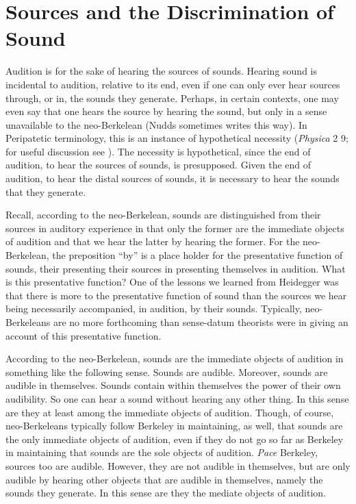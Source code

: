 
\section{Sources and the Discrimination of Sound} %
\label{sec:sources_and_the_discrimination_of_sound}

Audition is for the sake of hearing the sources of sounds. Hearing sound is incidental to audition, relative to its end, even if one can only ever hear sources through, or in, the sounds they generate. Perhaps, in certain contexts, one may even say that one hears the source by hearing the sound, but only in a sense unavailable to the neo-Berkelean (Nudds sometimes writes this way). In Peripatetic terminology, this is an instance of hypothetical necessity (\emph{Physica} 2 9; for useful discussion see \citealt{Charles:1988as}). The necessity is hypothetical, since the end of audition, to hear the sources of sounds, is presupposed. Given the end of audition, to hear the distal sources of sounds, it is necessary to hear the sounds that they generate.

Recall, according to the neo-Berkelean, sounds are distinguished from their sources in auditory experience in that only the former are the immediate objects of audition and that we hear the latter by hearing the former. For the neo-Berkelean, the preposition ``by'' is a place holder for the presentative function of sounds, their presenting their sources in presenting themselves in audition. What is this presentative function? One of the lessons we learned from Heidegger was that there is more to the presentative function of sound than the sources we hear being necessarily accompanied, in audition, by their sounds. Typically, neo-Berkeleans are no more forthcoming than sense-datum theorists were in giving an account of this presentative function.

According to the neo-Berkelean, sounds are the immediate objects of audition in something like the following sense. Sounds are audible. Moreover, sounds are audible in themselves. Sounds contain within themselves the power of their own audibility. So one can hear a sound without hearing any other thing.  In this sense are they at least among the immediate objects of audition. Though, of course, neo-Berkeleans typically follow Berkeley in maintaining, as well, that sounds are the only immediate objects of audition, even if they do not go so far as Berkeley in maintaining that sounds are the sole objects of audition. \emph{Pace} Berkeley, sources too are audible. However, they are not audible in themselves, but are only audible by hearing other objects that are audible in themselves, namely the sounds they generate. In this sense are they the mediate objects of audition.

